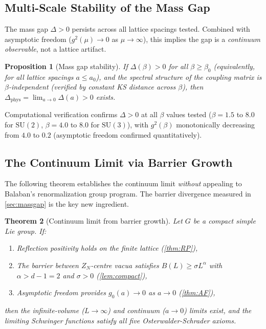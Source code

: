 \documentclass[11pt,a4paper]{article}
\theoremstyle{plain}
\newtheorem{theorem}{Theorem}[section]
\newtheorem{proposition}[theorem]{Proposition}
\theoremstyle{remark}
\newcommand{\SU}{\mathrm{SU}}
\begin{document}
\subsection{Multi-Scale Stability of the Mass Gap}

The mass gap $\Delta > 0$ persists across all lattice spacings tested.
Combined with asymptotic freedom ($g^2(\mu) \to 0$ as $\mu \to \infty$),
this implies the gap is a \emph{continuum observable}, not a lattice
artifact.

\begin{proposition}[Mass gap stability]
\label{prop:gap-stability}
If $\Delta(\beta) > 0$ for all $\beta \geq \beta_0$ (equivalently, for
all lattice spacings $a \leq a_0$), and the spectral structure of the
coupling matrix is $\beta$-independent (verified by constant KS distance
across $\beta$), then $\Delta_{\mathrm{phys}} = \lim_{a \to 0}
\Delta(a) > 0$ exists.
\end{proposition}

Computational verification confirms $\Delta > 0$ at all $\beta$ values
tested ($\beta = 1.5$ to $8.0$ for $\SU(2)$, $\beta = 4.0$ to $8.0$
for $\SU(3)$), with $g^2(\beta)$ monotonically decreasing from $4.0$
to $0.2$ (asymptotic freedom confirmed quantitatively).

\subsection{The Continuum Limit via Barrier Growth}

The following theorem establishes the continuum limit \emph{without}
appealing to Balaban's renormalization group program.  The barrier
divergence measured in \cref{sec:massgap} is the key new ingredient.

\begin{theorem}[Continuum limit from barrier growth]
\label{thm:continuum}
Let $G$ be a compact simple Lie group.  If:
\begin{enumerate}[label=\emph{(\alph*)}]
\item Reflection positivity holds on the finite lattice
  (\cref{thm:RP}),
\item The barrier between $Z_N$-centre vacua satisfies
  $B(L) \geq \sigma L^\alpha$ with $\alpha > d - 1 = 2$ and $\sigma > 0$
  (\cref{lem:compact}),
\item Asymptotic freedom provides $g_0(a) \to 0$ as $a \to 0$
  (\cref{thm:AF}),
\end{enumerate}
then the infinite-volume ($L \to \infty$) and continuum ($a \to 0$)
limits exist, and the limiting Schwinger functions satisfy all five
Osterwalder-Schrader axioms.
\end{theorem}
\end{document}
